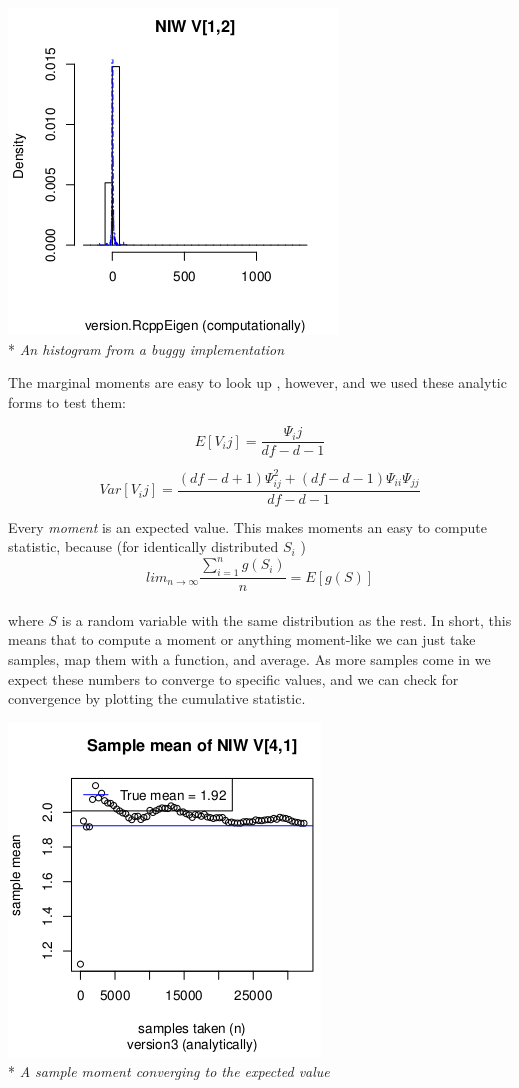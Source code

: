 \documentclass[english]{report}
\begin{document}
\begin{center}
\includegraphics[scale=.8]{densityincorrect.png}\\*
\emph{An histogram from a buggy implementation}
\\  
\end{center}

The marginal moments are easy to look up \cite{Wikipedia1}, however, and we used these analytic forms to test them:

\[ E[V_ij] =  \frac{\Psi_ij}{df - d - 1} \]

\[ Var[V_ij] =  \frac{(df - d  +1)\Psi_{ij}^2 + (df-d-1)\Psi_{ii}\Psi_{jj}}{df - d - 1} \]


Every \emph{moment} is an expected value. This makes moments an easy to compute statistic,
 because (for identically distributed $ S_i $ )
$$ lim_{n \rightarrow \infty} \frac{\sum_{i=1}^n g(S_i)}{n} = E[g(S)] $$ \\
where $S$ is a random variable with the same distribution as the rest.
In short, this means that to compute a moment or anything moment-like we can just take samples, map them with a function, and average.
As more samples come in we expect these numbers to converge to specific values, and we can check for convergence by plotting the cumulative statistic.


\begin{center}
\includegraphics[scale=.8]{momentcorrect.png}\\*
\emph{A sample moment converging to the expected value}
\end{center}
\end{document}
